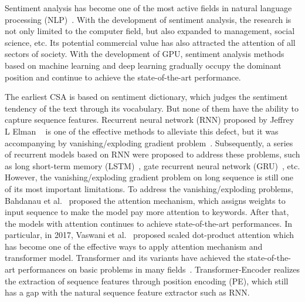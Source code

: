 Sentiment analysis has become one of the most active fields in natural language processing (NLP)~\cite{feldman2013techniques,zhang2018deep}. With the development of sentiment analysis, the research is not only limited to the computer field, but also expanded to management, social science, etc. 
Its potential commercial value has also attracted the attention of all sectors of society. With the development of GPU, sentiment analysis methods based on machine learning and deep learning gradually occupy the dominant position and continue to achieve the state-of-the-art performance. 

The earliest CSA is based on sentiment dictionary, which judges the sentiment tendency of the text through its vocabulary. But none of them have the ability to capture sequence features. Recurrent neural network (RNN) proposed by Jeffrey L Elman ~\cite{preRNN} is one of the effective methods to alleviate this defect, but it was accompanying by vanishing/exploding gradient problem~\cite{bengio1994Long-term-dependencies-diffcult}. Subsequently, a series of recurrent models based on RNN were proposed to address these problems, such as long short-term memory (LSTM)~\cite{hochreiter1997LSTM}, gate recurrent neural network (GRU)~\cite{cho2014learningGRU}, etc. However, the vanishing/exploding gradient problem on long sequence is still one of its most important limitations. To address the vanishing/exploding problems, Bahdanau et al.~\cite{bahdanau2014Attention-first} proposed the attention mechanism, which assigns weights to input sequence to make the model pay more attention to keywords. After that, the models with attention continues to achieve state-of-the-art performances. In particular, in 2017, Vaswani et al.~\cite{vaswani2017Transformer} proposed  scaled dot-product attention which has become one of the effective ways to apply attention mechanism and transformer model. Transformer and its variants have achieved the state-of-the-art performances on basic problems in many fields~\cite{BERT,vaswani2017Transformer}. Transformer-Encoder realizes the extraction of sequence features through position encoding (PE), which still has a gap with the natural sequence feature extractor such as RNN. 


